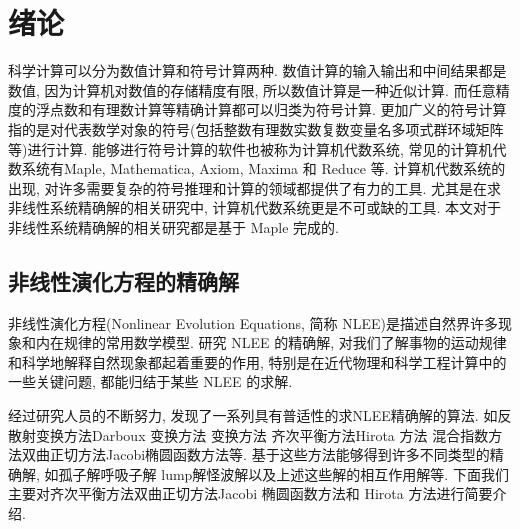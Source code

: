 \chapter{绪论} \label{ch01}
科学计算可以分为数值计算和符号计算两种. 数值计算的输入输出和中间结果都是数值, 因为计算机对数值的存储精度有限, 所以数值计算是一种近似计算. 而任意精度的浮点数和有理数计算等精确计算都可以归类为符号计算. 更加广义的符号计算指的是对代表数学对象的符号(包括整数\D 有理数\D 实数\D 复数\D 变量名\D 多项式\D 群\D 环\D 域\D 矩阵等)进行计算. 能够进行符号计算的软件也被称为计算机代数系统, 常见的计算机代数系统有Maple, Mathematica, Axiom, Maxima 和 Reduce 等. 计算机代数系统的出现, 对许多需要复杂的符号推理和计算的领域都提供了有力的工具. 尤其是在求非线性系统精确解的相关研究中, 计算机代数系统更是不可或缺的工具. 本文对于非线性系统精确解的相关研究都是基于 Maple 完成的. 

\section{非线性演化方程的精确解}
非线性演化方程(Nonlinear Evolution Equations, 简称 NLEE)是描述自然界许多现象和内在规律的常用数学模型. 研究 NLEE 的精确解, 对我们了解事物的运动规律和科学地解释自然现象都起着重要的作用, 特别是在近代物理和科学工程计算中的一些关键问题, 都能归结于某些 NLEE 的求解. 

经过研究人员的不断努力, 发现了一系列具有普适性的求NLEE精确解的算法. 如反散射变换方法\cite{kawata1978inverse,ma2014verifying}\D Darboux 变换方法 \cite{matveev1991darboux,ling2018general,lou1997non}\D \Backlund{}变换方法 \cite{wahlquist1973backlund,li2007method,cheng2015multiple}\D 齐次平衡方法\cite{zhibin1993travelling,wang1995solitary,wang1996application,hbm1998,hbm1998b,hbm1999,senthilvelan2001extended,zhao2002new,feng2004comment,nguyen2015modified,rady2010homogeneous,eslami2014exact}\D Hirota 方法 \cite{hirota1971exact,hereman1991exact,hu2002application,hirota2003vector,ma2015lump}\D 混合指数方法\cite{hereman1986exact}\D 双曲正切方法\cite{huang1989exact,malfliet1992solitary,li_book_2007,parkes1996automated,liu2001master,li2002rath}\D Jacobi椭圆函数方法\cite{liu2001jacobi,zhang2003jacobi,parkes2002jacobi,yin2002automated,yin2003automated,li2004raeem}等. 基于这些方法能够得到许多不同类型的精确解, 如孤子解\cite{hirota1971exact,makhankov1980computer}\D 呼吸子解 \cite{tajiri1989breather,guo2011rogue,sun2018general}\D lump解\cite{satsuma1979two,villarroel1999discrete,imai1997dromion}\D 怪波解\cite{guo2011rogue,zhang2014rogue,sun2018general,zhaqilao2018symbolic}以及上述这些解的相互作用解等. 下面我们主要对齐次平衡方法\D 双曲正切方法\D Jacobi 椭圆函数方法和 Hirota 方法进行简要介绍. 


